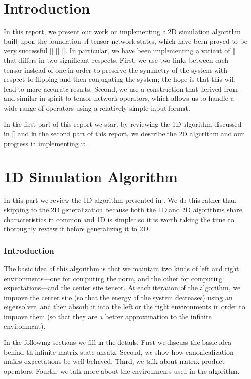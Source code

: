\documentclass{article}
\begin{document}
\tableofcontents

\part*{Introduction}

In this report, we present our work on implementing a 2D simulation algorithm built upon the foundation of tensor network states, which have been proved to be very successful [] [] [].  In particular, we have been implementing a variant of [] that differs in two significant respects.  First, we use two links between each tensor instead of one in order to preserve the symmetry of the system with respect to flipping and then conjugating the system;  the hope is that this will lead to more accurate results.  Second, we use a construction that derived from and similar in spirit to tensor network operators, which allows us to handle a wide range of operators using a relatively simple input format.

In the first part of this report we start by reviewing the 1D algorithm discussed in [] and in the second part of this report, we describe the 2D algorithm and our progress in implementing it.

\part{1D Simulation Algorithm}
\label{1dsim}

In this part we review the 1D algorithm presented in \cite{Crosswhite2008}.  We do this rather than skipping to the 2D generalization because both the 1D and 2D algorithms share characteristics in common and 1D is simpler so it is worth taking the time to thoroughly review it before generalizing it to 2D.

\section{Introduction}

The basic idea of this algorithm is that we maintain two kinds of left and right environments---one for computing the norm, and the other for computing expectations---and the center site tensor.  At each iteration of the algorithm, we improve the center site (so that the energy of the system decreases) using an eigensolver, and then absorb it into the left or the right environments in order to improve them (so that they are a better approximation to the infinite environment).

In the following sections we fill in the details.  First we discuss the basic idea behind th infinite matrix state ansatz.  Second, we show how canonicalization makes expectations be well-behaved.  Third, we talk about matrix product operators.  Fourth, we talk more about the environments used in the algorithm.
\end{document}
